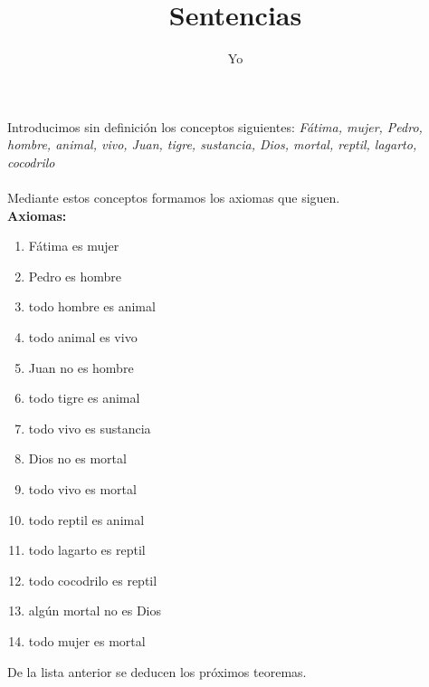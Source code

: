 ﻿\documentclass[12pt]{book}
\title{Sentencias}
\author{Yo}
\date{}
\begin{document}
\maketitle
 Introducimos sin definición los conceptos siguientes: \textit{
Fátima, mujer, Pedro, hombre, animal, vivo, Juan, tigre, sustancia, Dios, mortal, reptil, lagarto, cocodrilo}
\\
\\Mediante estos conceptos formamos los axiomas que siguen. \\
\textbf{Axiomas:}
\begin{enumerate}
\item Fátima es mujer
\item Pedro es hombre
\item todo hombre es animal
\item todo animal es vivo
\item Juan no es hombre
\item todo tigre es animal
\item todo vivo es sustancia
\item Dios no es mortal
\item todo vivo es mortal
\item todo reptil es animal
\item todo lagarto es reptil
\item todo cocodrilo es reptil
\item algún mortal no es Dios
\item todo mujer es mortal
\end{enumerate}De la lista anterior se deducen los próximos teoremas. \\
\end{document}
